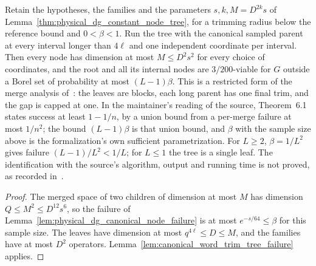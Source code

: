 \begin{lemma}
    \label{lem:physical_dg_constant_node_tree_probability}
    \leanok
    Retain the hypotheses, the families and the parameters $s,k,M=D^{2k}s$ of
    Lemma~\ref{thm:physical_dg_constant_node_tree}, for a trimming radius
    below the reference bound and $0<\beta<1$. Run the tree with the
    canonical sampled parent at every interval longer than $4\ell$ and one
    independent coordinate per interval. Then every node has dimension at most
    $M\le D^2s^2$ for every choice of coordinates, and the root and all its
    internal nodes are $3/200$-viable for $G$ outside a Borel set of
    probability at most $(L-1)\beta$. This is a restricted form of the merge
    analysis of~\cite[Theorem~\texttt{t:alg1}, lines
        1777--1818]{Arad2016RigorousRG}: the leaves are blocks, each long
    parent has one final trim, and the gap is capped at one. In the
    maintainer's reading of the source, Theorem~6.1 states success at least
    $1-1/n$, by a union bound from a per-merge failure at most $1/n^2$; the
    bound $(L-1)\beta$ is that union bound, and $\beta$ with the sample size
    above is the formalization's own sufficient parametrization. For $L\ge2$,
    $\beta=1/L^2$ gives failure $(L-1)/L^2<1/L$; for $L\le1$ the tree is a
    single leaf. The identification with the source's algorithm, output and
    running time is not proved, as recorded
    in~\cite{gap:alvv16_approximation_parameters}.
\end{lemma}
\begin{proof}\leanok
    The merged space of two children of dimension at most $M$ has dimension
    $Q\le M^2\le D^{12}s^6$, so the failure of
    Lemma~\ref{lem:physical_dg_canonical_node_failure} is at most
    $e^{-s/64}\le\beta$ for this sample size. The leaves have dimension at
    most $q^{4\ell}\le D\le M$, and the families have at most $D^2$
    operators. Lemma~\ref{lem:canonical_word_trim_tree_failure} applies.
\end{proof}
